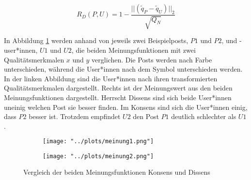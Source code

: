 \begin{equation}
\label{dissens}
R_D(P,U) = 1 - \frac{||(\tilde{q}_P - \tilde{q}_U)||_2}{\sqrt{Q_N}}
\end{equation}

\cleardoublepage
In Abbildung \ref{fig:vergleichmeinung} werden anhand von jeweils zwei Beispielposts, $P1$ und $P2$, und -user*innen, $U1$ und $U2$, die beiden Meinungsfunktionen mit zwei Qualitätsmerkmalen $x$ und $y$ verglichen. Die Posts werden nach Farbe unterschieden, während die User*innen nach dem Symbol unterschieden werden. In der linken Abbildung sind die User*innen nach ihren transformierten Qualitätsmerkmalen dargestellt. Rechts ist der Meinungswert aus den beiden Meinungsfunktionen dargestellt. Herrscht Dissens sind sich beide User*innen uneinig welchen Post sie besser finden. Im Konsens sind sich die User*innen einig, dass $P2$ besser ist. Trotzdem empfindet $U2$ den Post $P1$ deutlich schlechter als $U1$.

\begin{figure}[!h]
	\begin{subfigure}{0.6\textwidth}
		\texttt{[image: "../plots/meinung1.png"]}
	\end{subfigure}
	\begin{subfigure}{0.4\textwidth}
		\texttt{[image: "../plots/meinung2.png"]}
	\end{subfigure}
	\caption{Vergleich der beiden Meinungsfunktionen Konsens und Dissens}
	\label{fig:vergleichmeinung}
\end{figure}



